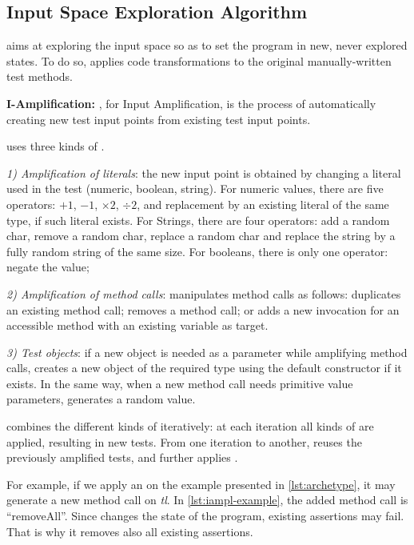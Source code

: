 \subsection{Input Space Exploration Algorithm}
\label{subsec:input-space-exploration}

\dspot aims at exploring the input space so as to set the program in new, never explored states. To do so, \dspot applies code transformations to the original manually-written test methods. 

\textbf{I-Amplification:} \Iampl, for Input Amplification, is the process of automatically creating new test input points from existing test input points.

\dspot uses three kinds of \Iampl.

\emph{1) Amplification of literals}: the new input point is obtained by changing a literal used in the test (numeric, boolean, string).
For numeric values, there are five operators: $+1$, $-1$, $\times 2$, $ \div 2$, and replacement by an existing literal of the same type, if such literal exists.
For Strings, there are four operators: add a random char, remove a random char, replace a random char and replace the string by a fully random string of the same size.
For booleans, there is only one operator: negate the value;

\emph{2) Amplification of method calls}: \dspot manipulates method calls as follows:
\dspot duplicates an existing method call; removes a method call;
or adds a new invocation for an accessible method with an existing variable as target.

\emph{3) Test objects}:
if a new object is needed as a parameter while amplifying method calls, \dspot creates a new object of the required type using the default constructor if it exists.
In the same way, when a new method call needs primitive value parameters, \dspot generates a random value.

\dspot combines the different kinds of \Iampl iteratively: at each iteration all kinds of \Iampl are applied, resulting in new tests. 
From one iteration to another, \dspot reuses the previously amplified tests, and further applies \Iampl{}.

For example, if we apply an \Iampl on the example presented in \autoref{lst:archetype}, it may generate a new method call on \emph{tl}.
In \autoref{lst:iampl-example}, the added method call is ``removeAll''. Since \dspot changes the state of the program, existing assertions may fail. That is why it removes also all existing assertions.


